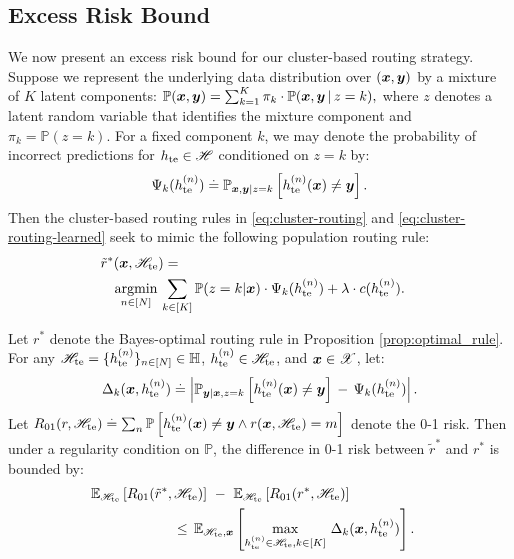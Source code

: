 \subsection{Excess Risk Bound}
\label{sec:excess-risk}
We now present an excess risk bound for our cluster-based routing strategy.
Suppose we represent the underlying data distribution over $(\boldsymbol{x},\boldsymbol{y})$ by a mixture of $K$ latent components:
$\mathbb{P}(\boldsymbol{x},\boldsymbol{y}) = \sum_{k=1}^{K}\pi_{k} \cdot \mathbb{P}(\boldsymbol{x},\boldsymbol{y}\,|\,z=k),$
where $z$
denotes a latent random variable that identifies the mixture
component and $\pi_{k}=\mathbb{P}(z=k)$. For a fixed component $k$, we may denote the probability of incorrect predictions
for $h_{\mathrm{te}}\in \mathscr{H}$ conditioned on $z=k$ by:
\[
\Psi_{k}( h_{\mathrm{te}}^{( n )} ) \stackrel{.}{=} \mathbb{P}_{\boldsymbol{x}, \boldsymbol{y}|z=k}\left[h_{\mathrm{te}}^{( n )}(\boldsymbol{x})\ne\boldsymbol{y}\right].
\]
Then the cluster-based routing rules in \eqref{eq:cluster-routing} and \eqref{eq:cluster-routing-learned} seek to mimic the following population routing rule:
\begin{equation}
    \begin{aligned}
    \label{eq:cluster-rule-population}
    \lefteqn{\tilde{r}^{*}(\bx, \msetNew)  =}
    \\
    & ~~~
    \underset{n \in [ \numSetNew ]}{\argmin} \, \sum_{k\in[K]}\mathbb{P}(z=k|\bx) \cdot \LLMEmbedScalar_{k}(\hNew^{(n)}) +\lambda \cdot c( \hNew^{(n)} ).
    \end{aligned}%
\end{equation}



\begin{prop}
\label{prop:cluster-regret-bound}
Let $r^*$ denote the Bayes-optimal routing rule in Proposition \ref{prop:optimal_rule}.
For any $\mathscr{H}_{\mathrm{te}} = \{ h_{\mathrm{te}}^{( n )} \}_{n \in [ N ]} \in \mathbb{H}$, 
$h_{\mathrm{te}}^{( n )} \in \mathscr{H}_{\mathrm{te}}$,
and
$\boldsymbol{x} \in \mathscr{X}$, let:
\begin{align*}
    \Delta_{k}(\boldsymbol{x}, h_{\mathrm{te}}^{( n )} ) \stackrel{.}{=} \left|\mathbb{P}_{\boldsymbol{y}|\boldsymbol{x},z=k}\left[h_{\mathrm{te}}^{( n )}(\boldsymbol{x})\neq\boldsymbol{y}\right] \,-\, \Psi_{k}( h_{\mathrm{te}}^{( n )} ) \right|.
\end{align*}
Let 
$R_{01}(r, \mathscr{H}_{\mathrm{te}}) \stackrel{.}{=} \sum_{n} \mathbb{P} \left[ h_{\mathrm{te}}^{( n )}(\boldsymbol{x})\neq\boldsymbol{y} \land r(\boldsymbol{x}, \mathscr{H}_{\mathrm{te}})=m \right]$ 
denote the 0-1 risk. %
Then under a regularity condition on $\mathbb{P}$,
the difference in 0-1 risk between $\tilde{r}^*$ and $r^*$ is bounded by:
\begin{align*}
\lefteqn{\mathbb{E}_{\msetNew}\left[R_{01}(\tilde{r}^*,\msetNew)\right] ~-~ \mathbb{E}_{\msetNew}\left[{R}_{01}(r^*,\msetNew)\right]} \\
&\hspace{2cm}
 \,\leq\,
\mathbb{E}_{\msetNew, \bx}\left[\max_{\hNew^{( n )} \in \msetNew, k\in[K]}\,\Delta_{k}(\bx, \hNew^{( n )} )\right].
\end{align*}
\end{prop}


